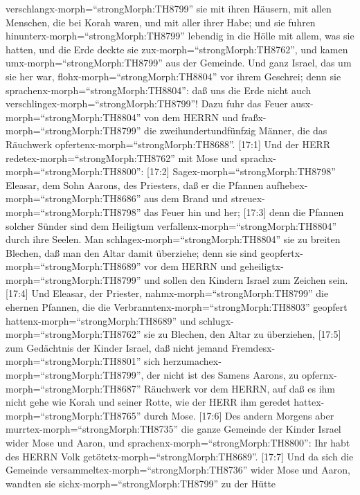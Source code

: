 verschlangx-morph=``strongMorph:TH8799'' sie mit ihren Häusern, mit
allen Menschen, die bei Korah waren, und mit aller ihrer Habe;
 und sie fuhren hinunterx-morph=``strongMorph:TH8799''
lebendig in die Hölle mit allem, was sie hatten, und die Erde deckte sie
zux-morph=``strongMorph:TH8762'', und kamen
umx-morph=``strongMorph:TH8799'' aus der Gemeinde.  Und
ganz Israel, das um sie her war, flohx-morph=``strongMorph:TH8804'' vor
ihrem Geschrei; denn sie sprachenx-morph=``strongMorph:TH8804'': daß uns
die Erde nicht auch verschlingex-morph=``strongMorph:TH8799''!
 Dazu fuhr das Feuer ausx-morph=``strongMorph:TH8804'' von
dem HERRN und fraßx-morph=``strongMorph:TH8799'' die
zweihundertundfünfzig Männer, die das Räuchwerk
opfertenx-morph=``strongMorph:TH8688''.  {[}17:1{]} Und der
HERR redetex-morph=``strongMorph:TH8762'' mit Mose und
sprachx-morph=``strongMorph:TH8800'':  {[}17:2{]}
Sagex-morph=``strongMorph:TH8798'' Eleasar, dem Sohn Aarons, des
Priesters, daß er die Pfannen aufhebex-morph=``strongMorph:TH8686'' aus
dem Brand und streuex-morph=``strongMorph:TH8798'' das Feuer hin und
her;  {[}17:3{]} denn die Pfannen solcher Sünder sind dem
Heiligtum verfallenx-morph=``strongMorph:TH8804'' durch ihre Seelen. Man
schlagex-morph=``strongMorph:TH8804'' sie zu breiten Blechen, daß man
den Altar damit überziehe; denn sie sind
geopfertx-morph=``strongMorph:TH8689'' vor dem HERRN und
geheiligtx-morph=``strongMorph:TH8799'' und sollen den Kindern Israel
zum Zeichen sein.  {[}17:4{]} Und Eleasar, der Priester,
nahmx-morph=``strongMorph:TH8799'' die ehernen Pfannen, die die
Verbranntenx-morph=``strongMorph:TH8803'' geopfert
hattenx-morph=``strongMorph:TH8689'' und
schlugx-morph=``strongMorph:TH8762'' sie zu Blechen, den Altar zu
überziehen,  {[}17:5{]} zum Gedächtnis der Kinder Israel,
daß nicht jemand Fremdesx-morph=``strongMorph:TH8801'' sich
herzumachex-morph=``strongMorph:TH8799'', der nicht ist des Samens
Aarons, zu opfernx-morph=``strongMorph:TH8687'' Räuchwerk vor dem HERRN,
auf daß es ihm nicht gehe wie Korah und seiner Rotte, wie der HERR ihm
geredet hattex-morph=``strongMorph:TH8765'' durch Mose. 
{[}17:6{]} Des andern Morgens aber murrtex-morph=``strongMorph:TH8735''
die ganze Gemeinde der Kinder Israel wider Mose und Aaron, und
sprachenx-morph=``strongMorph:TH8800'': Ihr habt des HERRN Volk
getötetx-morph=``strongMorph:TH8689''.  {[}17:7{]} Und da
sich die Gemeinde versammeltex-morph=``strongMorph:TH8736'' wider Mose
und Aaron, wandten sie sichx-morph=``strongMorph:TH8799'' zu der Hütte
